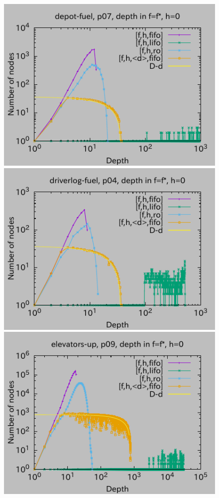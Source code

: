 \begin{figure}[htbp]
\includegraphics{img/depth/depot-fuel/p07.pdf}
\includegraphics{img/depth/driverlog-fuel/p04.pdf}
\includegraphics{img/depth/elevators-up/p09.pdf}

\end{figure}
